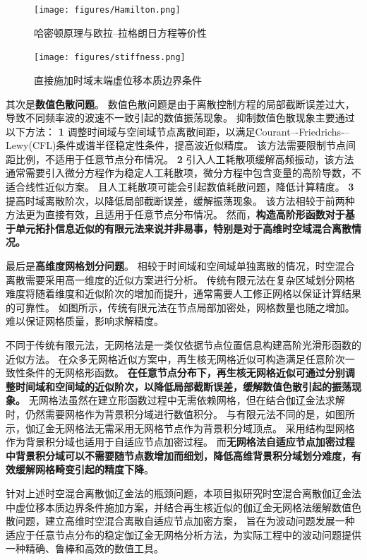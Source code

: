 \begin{figure}[!h]
    \centering 
    \texttt{[image: figures/Hamilton.png]}
    \caption{哈密顿原理与欧拉--拉格朗日方程等价性}
    \label{fg:hamilton}
\end{figure}

\begin{figure}[!h]
    \centering 
    \texttt{[image: figures/stiffness.png]}
    \caption{直接施加时域末端虚位移本质边界条件}
    \label{fg:direct}
\end{figure}

其次是\textbf{数值色散问题}。
数值色散问题是由于离散控制方程的局部截断误差过大，导致不同频率波的波速不一致引起的数值振荡现象\cite{zhang2024}。
抑制数值色散现象主要通过以下方法：
\textcircled{\textbf{\small 1}}
调整时间域与空间域节点离散间距，以满足Courant–-Friedrichs-–Lewy(CFL)条件或谱半径稳定性条件，提高波近似精度。
该方法需要限制节点间距比例，不适用于任意节点分布情况。
\textcircled{\textbf{\small 2}}
引入人工耗散项缓解高频振动，该方法通常需要引入微分方程作为稳定人工耗散项，微分方程中包含变量的高阶导数，不适合线性近似方案。
且人工耗散项可能会引起数值耗散问题，降低计算精度。
\textcircled{\textbf{\small 3}}
提高时域离散阶次，以降低局部截断误差，缓解振荡现象。
该方法相较于前两种方法更为直接有效，且适用于任意节点分布情况。
然而，\textbf{构造高阶形函数对于基于单元拓扑信息近似的有限元法来说并非易事，特别是对于高维时空域混合离散情况。}

最后是\textbf{高维度网格划分问题}。
相较于时间域和空间域单独离散的情况，时空混合离散需要采用高一维度的近似方案进行分析。
传统有限元法在复杂区域划分网格难度将随着维度和近似阶次的增加而提升，通常需要人工修正网格以保证计算结果的可靠性。
如图所示，传统有限元法在节点局部加密处，网格数量也随之增加。
难以保证网格质量，影响求解精度。

不同于传统有限元法，无网格法\cite{Zhang2004a}是一类仅依据节点位置信息构建高阶光滑形函数的近似方法。
在众多无网格近似方案中，再生核无网格近似可构造满足任意阶次一致性条件的无网格形函数。
\textbf{在任意节点分布下，再生核无网格近似可通过分别调整时间域和空间域的近似阶次，以降低局部截断误差，缓解数值色散引起的振荡现象。}
无网格法虽然在建立形函数过程中无需依赖网格，但在结合伽辽金法求解时，仍然需要网格作为背景积分域进行数值积分。
与有限元法不同的是，如图所示，伽辽金无网格法无需采用无网格节点作为背景积分域顶点。
采用结构型网格作为背景积分域也适用于自适应节点加密过程。
而\textbf{无网格法自适应节点加密过程中背景积分域可以不需要随节点数增加而细划，降低高维背景积分域划分难度，有效缓解网格畸变引起的精度下降}。

针对上述时空混合离散伽辽金法的瓶颈问题，本项目拟研究时空混合离散伽辽金法中虚位移本质边界条件施加方案，并结合再生核近似的伽辽金无网格法缓解数值色散问题，建立高维时空混合离散自适应节点加密方案，
旨在为波动问题发展一种适应于任意节点分布的稳定伽辽金无网格分析方法，为实际工程中的波动问题提供一种精确、鲁棒和高效的数值工具。

